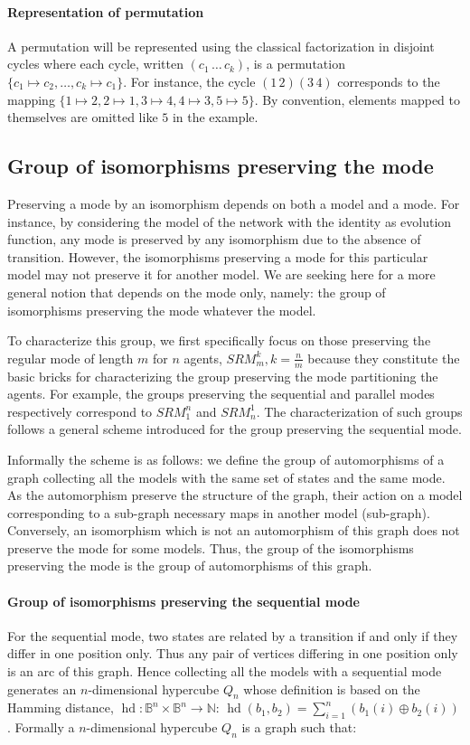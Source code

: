 \documentclass[12pt]{elsarticle}
\newcommand{\Nset}[0]{\mathbb{N}}
\newcommand{\Bset}[0]{\mathbb{B}}
\newcommand{\lxor}[0]{\oplus}
\begin{document}
\paragraph{Representation of permutation} A permutation will be represented using the classical factorization in disjoint cycles where each cycle, written $(c_1\,\ldots\,c_k)$, is a permutation $\{c_1 \mapsto c_2, \ldots, c_k \mapsto c_1 \}$. For instance, the cycle $(1\,2)(3\,4)$ corresponds to the mapping $\{ 1 \mapsto 2, 2 \mapsto 1, 3 \mapsto 4 ,4 \mapsto 3, 5 \mapsto 5\}$. By convention, elements mapped to themselves are omitted like $5$ in the example. 

\subsection{Group of isomorphisms preserving the mode}

Preserving a mode by an isomorphism depends on both a model and a mode. For instance, by considering the model of the network with the identity as evolution function, any mode is preserved by any isomorphism due to the absence of transition. However, the isomorphisms preserving a mode for this particular model may not preserve it for another model. We are seeking here for a more general notion that depends on the mode only, namely: the group of isomorphisms preserving the mode whatever the model. 

To characterize this group,  we first specifically focus on those preserving the regular mode of length $m$ for $n$ agents, $SRM^k_m, k= \frac{n}{m}$  because they constitute the basic bricks for characterizing the group preserving the mode partitioning the agents. For example, the groups preserving the sequential and parallel modes respectively correspond to $SRM_1^n$ and $SRM_n^1$. The characterization of such groups follows a general scheme introduced for the group preserving the sequential mode. 

Informally the scheme is as follows: we define the group of automorphisms of a graph collecting all the models with the same set of states and the same mode. As the automorphism preserve the structure of the graph, their action on  a model corresponding to a sub-graph necessary maps in another model (sub-graph). Conversely, an isomorphism which is not an automorphism of this graph does not preserve the mode for some models. Thus, the group of the isomorphisms preserving the mode is the group of automorphisms of this graph.

\paragraph{Group of isomorphisms preserving the sequential mode}  For the sequential mode, two states are related by a transition if and only if they differ in one position only. Thus any pair of vertices differing in one position only is an arc of this graph. Hence  collecting all the models with a sequential mode generates an $n$-dimensional hypercube $Q_n$ \cite{Harary1988} whose definition is based on the Hamming distance, $\operatorname{hd}:\Bset^n \times \Bset^n \to \Nset$: $\operatorname{hd}(b_1,b_2)=\sum_{i=1}^n( b_1(i) \lxor b_2(i))$. Formally a $n$-dimensional hypercube $Q_n$ is a graph such that: 
\end{document}

